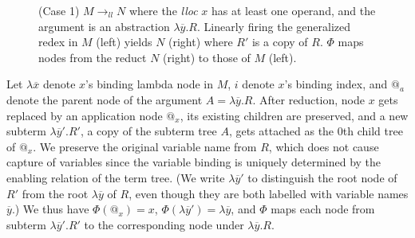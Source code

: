 \documentclass{elsarticle}
\theoremstyle{plain}
\theoremstyle{definition}
\newcommand{\llred}{\rightarrow_{ll}}
\begin{document}
\begin{wrapfigure}{L}{0.6\textwidth}
\caption{(Case 1) $M\llred N$ where the \emph{lloc} $x$ has at least one operand, and the argument is an abstraction $\lambda\overline{y} . R$.
 Linearly firing the generalized redex in $M$ (left)
 yields $N$ (right) where $R'$ is a copy of $R$.
$\Phi$ maps nodes from the reduct $N$ (right) to those of $M$ (left).}
\label{fig:firing_genredex_effect_on_tree_with_operands_and_lambda_argument}
\end{wrapfigure}

%
Let $\lambda\overline{x}$ denote $x$'s binding lambda node in $M$, $i$ denote $x$'s binding index, and $@_a$ denote the parent node of the argument $A = \lambda\overline{y}. R$.
After reduction,
node $x$ gets replaced by an application node $@_x$,  its existing children are preserved, and a new subterm $\lambda\overline{y}'. R'$, a copy of the subterm tree $A$, gets attached as the $0$th child tree of $@_x$.
We preserve the original variable name from $R$, which does not cause capture of variables since the variable binding is uniquely determined by the enabling relation of the term tree.
(We write $\lambda\overline{y}'$ to distinguish the root node of $R'$ from the root $\lambda\overline{y}$ of $R$, even though they are both labelled with variable names $\overline{y}$.)
%
We thus have $\Phi(@_x) = x$, $\Phi(\lambda\overline{y}') = \lambda\overline{y}$, and $\Phi$ maps each node from subterm $\lambda\overline{y}'. R'$  to the corresponding node under $\lambda\overline{y}.R$.
%
\end{document}
